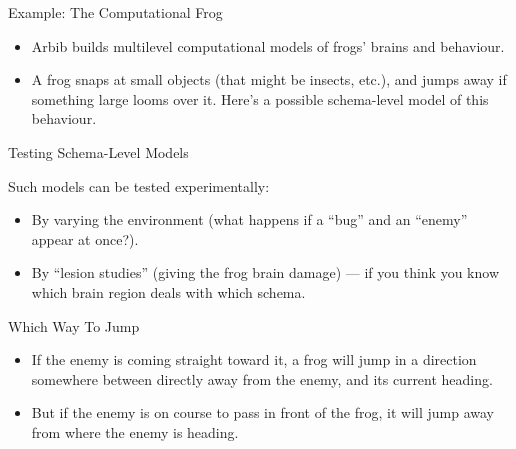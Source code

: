 \documentclass{article}
\begin{document}
\begin{slide}{}
{\Large Example: The Computational Frog}
\begin{itemize}
\item Arbib builds multilevel computational models of frogs'
brains and behaviour.
\item A frog snaps
at small objects (that might be insects, etc.), and jumps away if
something large looms over it. Here's a possible schema-level model of
this behaviour.
\end{itemize}
\begin{center}


\end{center}
\end{slide}

\begin{slide}{}
{\Large Testing Schema-Level Models}

Such models can be tested experimentally:
\begin{itemize}
\item By varying the environment (what happens if a ``bug'' and an
``enemy'' appear at once?).
\item By ``lesion studies'' (giving the frog brain damage) --- if you
think you know which brain region deals with which schema.
\end{itemize}
\begin{center}


\end{center}
\end{slide}

\begin{slide}{}
{\Large Which Way To Jump}
\begin{itemize}
\item If the enemy is coming straight toward it, a frog will jump in a
direction somewhere between directly away from the enemy, and its
current heading.
\item But if the enemy is on course to pass in front
of the frog, it will jump away from where the enemy is heading.
\end{itemize}
\begin{center}


\end{center}
\end{slide}
\end{document}
